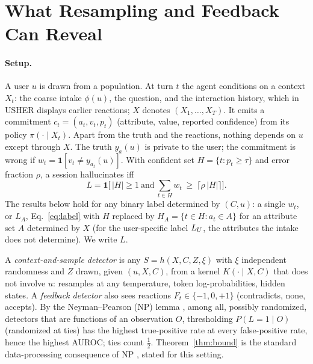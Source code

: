 \section{What Resampling and Feedback Can Reveal}
\label{sec:theory}

\paragraph{Setup.}
A user $u$ is drawn from a population. At turn $t$ the agent conditions on a
context $X_t$: the coarse intake $\phi(u)$, the question, and the interaction
history, which in USHER displays earlier reactions; $X$ denotes
$(X_1,\dots,X_T)$. It emits a commitment $c_t=(a_t,v_t,p_t)$
(attribute, value, reported confidence) from its policy $\pi(\cdot\mid X_t)$.
Apart from the truth and the reactions, nothing depends on $u$ except through
$X$. The truth $y_{a}(u)$ is private to the user; the commitment is wrong if
$w_t=\mathbf{1}[v_t\neq y_{a_t}(u)]$. With confident set $H=\{t:p_t\ge\tau\}$
and error fraction $\rho$, a session hallucinates iff
\begin{equation}
L=\mathbf{1}\Big[\,|H|\ge 1\ \text{and}\ \textstyle\sum_{t\in H} w_t \ \ge\ \lceil \rho\,|H|\rceil\Big].
\label{eq:label}
\end{equation}
The results below hold for any binary label determined by $(C,u)$: a single $w_t$, or $L_A$,
Eq.~\eqref{eq:label} with $H$ replaced by $H_A=\{t\in H:a_t\in A\}$ for an
attribute set $A$ determined by $X$ (for the user-specific label $L_{U}$, the
attributes the intake does not determine). We write $L$.

A \emph{context-and-sample detector} is any $S=h(X,C,Z,\xi)$ with $\xi$
independent randomness and $Z$ drawn, given $(u,X,C)$, from a kernel
$K(\cdot\mid X,C)$ that does not involve $u$: resamples at any temperature,
token log-probabilities, hidden states. A \emph{feedback detector} also sees
reactions $F_t\in\{-1,0,+1\}$ (contradicts, none, accepts). By the
Neyman--Pearson (NP) lemma \citep{neyman1933problem}, among all, possibly
randomized, detectors that are functions of an observation $O$, thresholding
$P(L=1\mid O)$ (randomized at ties) has the highest true-positive rate at
every false-positive rate, hence the highest AUROC; ties count $\tfrac12$.
Theorem~\ref{thm:bound} is the standard data-processing consequence of NP
\citep{neyman1933problem,blackwell1953equivalent}, stated for this setting.

